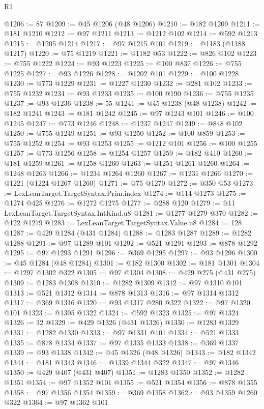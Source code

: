 \begin{lexlean}{R1}
\begin{coremodule}
@1206 := 87
@1209 := @45 @1206 (@48 @1206)
@1210 := @182 @1209
@1211 := @181 @1210
@1212 := @97 @1211
@1213 := @1212 @102
@1214 := @592 @1213
@1215 := @1205 @1214
@1217 := @97 @1215 @101
@1219 := @1183 (@1188 @1217)
@1220 := @75 @1219
@1221 := @1182 @53
@1222 := @826 @102
@1223 := @755 @1222
@1224 := @93 @1223
@1225 := @100 @837
@1226 := @755 @1225
@1227 := @93 @1226
@1228 := @1202 @101
@1229 := @100 @1228
@1230 := @773 @1229
@1231 := @1227 @1230
@1232 := @281 @102
@1233 := @755 @1232
@1234 := @93 @1233
@1235 := @100 @190
@1236 := @755 @1235
@1237 := @93 @1236
@1238 := 55
@1241 := @45 @1238 (@48 @1238)
@1242 := @182 @1241
@1243 := @181 @1242
@1245 := @97 @1243 @101
@1246 := @100 @1245
@1247 := @773 @1246
@1248 := @1237 @1247
@1249 := @848 @102
@1250 := @755 @1249
@1251 := @93 @1250
@1252 := @100 @859
@1253 := @755 @1252
@1254 := @93 @1253
@1255 := @1212 @101
@1256 := @100 @1255
@1257 := @773 @1256
@1258 := @1254 @1257
@1259 := @182 @410
@1260 := @181 @1259
@1261 := @1258 @1260
@1263 := @1251 @1261 @1260
@1264 := @1248 @1263
@1266 := @1234 @1264 @1260
@1267 := @1231 @1266
@1270 := @1221 (@1224 @1267 @1260)
@1271 := @75 @1270
@1272 := @350 @53
@1273 := LexLeanTarget.TargetSyntax.Prim.index
@1274 := @114 @1273
@1275 := @1274 @425
@1276 := @1272 @1275
@1277 := @288 @120
@1279 := @11 LexLeanTarget.TargetSyntax.IntKind.u8
@1281 := @1277 @1279 @370
@1282 := @122 @1279
@1283 := LexLeanTarget.TargetSyntax.Value.u8
@1284 := 128
@1287 := @429 @1284 (@431 @1284)
@1288 := @1283 @1287
@1289 := @1282 @1288
@1291 := @97 @1289 @101
@1292 := @521 @1291
@1293 := @878 @1292
@1295 := @97 @1293 @1291
@1296 := @369 @1295
@1297 := @93 @1296
@1300 := @45 @1284 (@48 @1284)
@1301 := @182 @1300
@1302 := @181 @1301
@1304 := @1297 @1302 @322
@1305 := @97 @1304
@1308 := @429 @275 (@431 @275)
@1309 := @1283 @1308
@1310 := @1282 @1309
@1312 := @97 @1310 @101
@1313 := @521 @1312
@1314 := @878 @1313
@1316 := @97 @1314 @1312
@1317 := @369 @1316
@1320 := @93 @1317 @280 @322
@1322 := @97 @1320 @101
@1323 := @1305 @1322
@1324 := @592 @1323
@1325 := @97 @1324
@1326 := 32
@1329 := @429 @1326 (@431 @1326)
@1330 := @1283 @1329
@1331 := @1282 @1330
@1333 := @97 @1331 @101
@1334 := @521 @1333
@1335 := @878 @1334
@1337 := @97 @1335 @1333
@1338 := @369 @1337
@1339 := @93 @1338
@1342 := @45 @1326 (@48 @1326)
@1343 := @182 @1342
@1344 := @181 @1343
@1346 := @1339 @1344 @322
@1347 := @97 @1346
@1350 := @429 @407 (@431 @407)
@1351 := @1283 @1350
@1352 := @1282 @1351
@1354 := @97 @1352 @101
@1355 := @521 @1354
@1356 := @878 @1355
@1358 := @97 @1356 @1354
@1359 := @369 @1358
@1362 := @93 @1359 @1260 @322
@1364 := @97 @1362 @101

\end{coremodule}
\end{lexlean}
